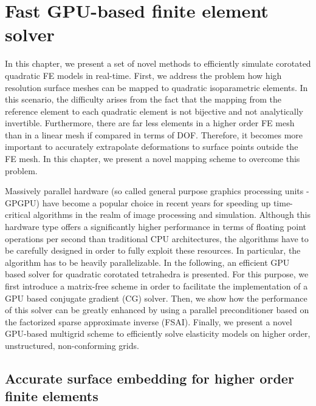


\chapter{Fast GPU-based finite element solver}

In this chapter, we present a set of novel methods to efficiently simulate corotated quadratic FE models in real-time. First, we address the problem how high resolution surface meshes can be mapped to quadratic isoparametric elements. In this scenario, the difficulty arises from the fact that the mapping from the reference element to each quadratic element is not bijective and not analytically invertible. Furthermore, there are far less elements in a higher order FE mesh than in a linear mesh if compared in terms of DOF. Therefore, it becomes more important to accurately extrapolate deformations to surface points outside the FE mesh. In this chapter, we present a novel mapping scheme to overcome this problem.

Massively parallel hardware (so called general purpose graphics processing units - GPGPU) have become a popular choice in recent years for speeding up time-critical algorithms in the realm of image processing and simulation. Although this hardware type offers a significantly higher performance in terms of floating point operations per second than traditional CPU architectures, the algorithms have to be carefully designed in order to fully exploit these resources. In particular, the algorithm has to be heavily parallelizable. In the following, an efficient GPU based solver for quadratic corotated tetrahedra is presented. For this purpose, we first introduce a matrix-free scheme in order to facilitate the implementation of a GPU based conjugate gradient (CG) solver. Then, we show how the performance of this solver can be greatly enhanced by using a parallel preconditioner based on the factorized sparse approximate inverse (FSAI). Finally, we present a novel GPU-based multigrid scheme to efficiently solve elasticity models on higher order, unstructured, non-conforming grids.

\section{Accurate surface embedding for higher order finite elements}
\label{AccurateSurfaceEmbeddingSection}

